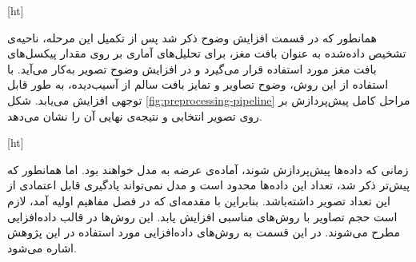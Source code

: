 
[ht]

همانطور که در قسمت افزایش وضوح ذکر شد پس از تکمیل این مرحله، ناحیه‌ی تشخیص داده‌شده به عنوان بافت مغز، برای تحلیل‌های آماری بر روی مقدار پیکسل‌های بافت مغز مورد استفاده قرار می‌گیرد و در افزایش وضوح تصویر به‌کار می‌آید.
با استفاده از این روش، وضوح تصاویر و تمایز بافت سالم از آسیب‌دیده، به طور قابل توجهی افزایش می‌یابد.
شکل \ref{fig:preprocessing-pipeline}
مراحل کامل پیش‌پردازش بر روی تصویر انتخابی و نتیجه‌ی نهایی آن را نشان می‌دهد.


[ht]



زمانی که داده‌ها پیش‌پردازش شوند، آماده‌ی عرضه به مدل خواهند بود.
اما همانطور که پیش‌تر ذکر شد، تعداد این داده‌ها محدود است و مدل نمی‌تواند یادگیری قابل اعتمادی از این تعداد تصویر داشته‌باشد.
بنابراین
 با مقدمه‌ای که در فصل مفاهیم اولیه آمد، لازم است حجم تصاویر با روش‌های مناسبی افزایش یابد.
 این روش‌ها در قالب داده‌افزایی مطرح می‌شوند.
 در این قسمت به روش‌های داده‌افزایی مورد استفاده در این پژوهش اشاره می‌شود.

